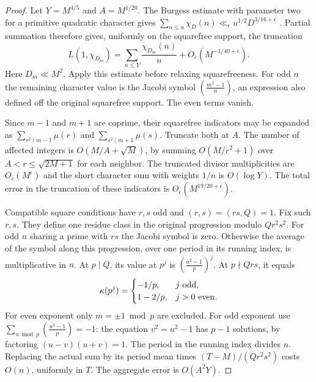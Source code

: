 \documentclass[11pt]{article}
\newcommand{\leg}[2]{\left(\frac{#1}{#2}\right)}
\begin{document}
\begin{proof}
Let $Y=M^{4/5}$ and $A=M^{1/20}$. The Burgess estimate with parameter
two for a primitive quadratic character gives
$\sum_{n\le u}\chi_D(n)\ll_\epsilon u^{1/2}D^{3/16+\epsilon}$
\cite[(1)]{HB}. Partial summation therefore gives, uniformly on the
squarefree support, the truncation
\[
 L(1,\chi_{D_m})=\sum_{n\le Y}\frac{\chi_{D_m}(n)}n+
 O_\epsilon(M^{-1/40+\epsilon}).
\]
Here $D_m\ll M^2$. Apply this estimate before relaxing squarefreeness.
For odd $n$ the remaining character value is the Jacobi symbol
$\leg{m^2-1}{n}$, an expression also defined off the original
squarefree support. The even terms vanish.

Since $m-1$ and $m+1$ are coprime, their squarefree indicators may
be expanded as $\sum_{r^2\mid m-1}\mu(r)$ and
$\sum_{s^2\mid m+1}\mu(s)$. Truncate both at $A$. The number of
affected integers is $O(M/A+\sqrt M)$, by summing $O(M/r^2+1)$
over $A<r\le\sqrt{2M+1}$ for each neighbor. The truncated divisor
multiplicities are $O_\epsilon(M^\epsilon)$ and the short character
sum with weights $1/n$ is $O(\log Y)$. The total error in the
truncation of these indicators is $O_\epsilon(M^{19/20+\epsilon})$.

Compatible square conditions have $r,s$ odd and $(r,s)=(rs,Q)=1$.
Fix such $r,s$. They define one residue class in the original
progression modulo $Qr^2s^2$. For odd $n$ sharing a prime with
$rs$ the Jacobi symbol is zero. Otherwise the average of the
symbol along this progression, over one period in its running
index, is multiplicative in $n$. At $p\mid Q$, its value at $p^j$
is $\leg{a^2-1}{p}^j$. At $p\nmid Qrs$, it equals
\[
 \kappa(p^j)=
 \begin{cases}
  -1/p,&j\ {\rm odd},\\
  1-2/p,&j>0\ {\rm even}.
 \end{cases}
\]
For even exponent only $m=\pm1\bmod p$ are excluded. For odd
exponent use $\sum_{u\bmod p}\leg{u^2-1}{p}=-1$: the equation
$v^2=u^2-1$ has $p-1$ solutions, by factoring $(u-v)(u+v)=1$.
The period in the running index divides $n$. Replacing the actual
sum by its period mean times $(T-M)/(Qr^2s^2)$ costs $O(n)$,
uniformly in $T$. The aggregate error is $O(A^2Y)$.


\end{proof}
\end{document}
